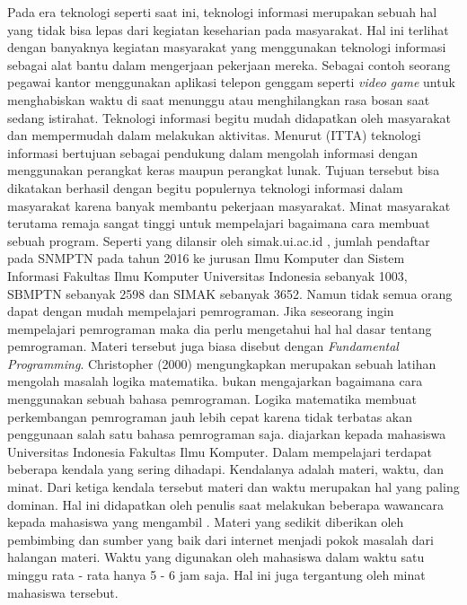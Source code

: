 Pada era teknologi seperti saat ini, teknologi informasi merupakan sebuah hal yang tidak bisa lepas dari kegiatan keseharian pada masyarakat. Hal ini terlihat dengan banyaknya kegiatan masyarakat yang menggunakan teknologi informasi sebagai alat bantu dalam mengerjaan pekerjaan mereka. Sebagai contoh seorang pegawai kantor menggunakan aplikasi telepon genggam seperti \textit{video game} untuk menghabiskan waktu di saat menunggu atau menghilangkan rasa bosan saat sedang istirahat.
\linebreak
\linebreak
Teknologi informasi begitu mudah didapatkan oleh masyarakat dan mempermudah dalam melakukan aktivitas. Menurut \ITTA (ITTA) teknologi informasi bertujuan sebagai pendukung dalam mengolah informasi dengan menggunakan perangkat keras maupun perangkat lunak. Tujuan tersebut bisa dikatakan berhasil dengan begitu populernya teknologi informasi dalam masyarakat karena banyak membantu pekerjaan masyarakat.
\linebreak\linebreak
Minat masyarakat terutama remaja sangat tinggi untuk mempelajari bagaimana cara membuat sebuah program. Seperti yang dilansir oleh simak.ui.ac.id \citep{article.simak}, jumlah pendaftar pada SNMPTN pada tahun 2016 ke jurusan Ilmu Komputer dan Sistem Informasi Fakultas Ilmu Komputer Universitas Indonesia sebanyak 1003, SBMPTN sebanyak 2598 dan SIMAK sebanyak 3652. Namun tidak semua orang dapat dengan mudah mempelajari pemrograman. Jika seseorang ingin mempelajari pemrograman maka dia perlu mengetahui hal hal dasar tentang pemrograman. Materi tersebut juga biasa disebut dengan \textit{Fundamental Programming}.
\linebreak\linebreak
Christopher (2000) mengungkapkan \ddp merupakan sebuah latihan mengolah masalah logika matematika. \DDP bukan mengajarkan bagaimana cara menggunakan sebuah bahasa pemrograman. Logika matematika membuat perkembangan pemrograman jauh lebih cepat karena tidak terbatas akan penggunaan salah satu bahasa pemrograman saja.
\linebreak\linebreak
\DDP diajarkan kepada mahasiswa Universitas Indonesia Fakultas Ilmu Komputer. Dalam mempelajari \ddp terdapat beberapa kendala yang sering dihadapi. Kendalanya adalah materi, waktu, dan minat. Dari ketiga kendala tersebut materi dan waktu merupakan hal yang paling dominan. Hal ini didapatkan oleh penulis saat melakukan beberapa wawancara kepada mahasiswa yang mengambil \ddp. Materi yang sedikit diberikan oleh pembimbing dan sumber yang baik dari internet menjadi pokok masalah dari halangan materi. Waktu yang digunakan oleh mahasiswa dalam waktu satu minggu rata - rata hanya 5 - 6 jam saja. Hal ini juga tergantung oleh minat mahasiswa tersebut.
